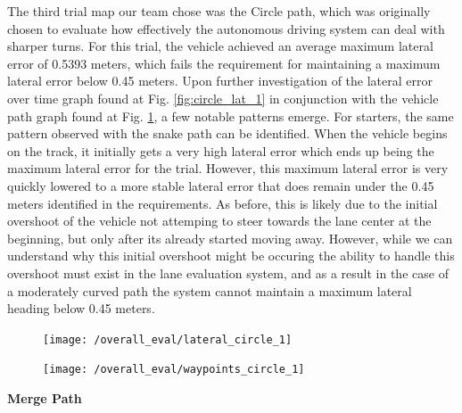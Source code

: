 \documentclass[titlepage,draft]{article}
\begin{document}
{The third trial map our team chose was the Circle path, which was originally chosen to evaluate how effectively the autonomous driving system can deal with sharper turns. For this trial, the vehicle achieved an average maximum lateral error of 0.5393 meters, which fails the requirement for maintaining a maximum lateral error below 0.45 meters. Upon further investigation of the lateral error over time graph found at Fig. \ref{fig:circle_lat_1} in conjunction with the vehicle path graph found at Fig. \ref{fig:circle_way_1}, a few notable patterns emerge. For starters, the same pattern observed with the snake path can be identified. When the vehicle begins on the track, it initially gets a very high lateral error which ends up being the maximum lateral error for the trial. However, this maximum lateral error is very quickly lowered to a more stable lateral error that does remain under the 0.45 meters identified in the requirements. As before, this is likely due to the initial overshoot of the vehicle not attemping to steer towards the lane center at the beginning, but only after its already started moving away. However, while we can understand why this initial overshoot might be occuring the ability to handle this overshoot must exist in the lane evaluation system, and as a result in the case of a moderately curved path the system cannot maintain a maximum lateral heading below 0.45 meters.

\begin{figure}
	\centering
	\begin{minipage}{.45\textwidth}
		\centering
		\texttt{[image: /overall\_eval/lateral\_circle\_1]}
		\label{fig:circle_lat_1}
	\end{minipage}%
	\hspace{0.1\textwidth}%
	\begin{minipage}{.45\textwidth}
		\centering
		\texttt{[image: /overall\_eval/waypoints\_circle\_1]}
		\label{fig:circle_way_1}
	\end{minipage}
\end{figure}

\textbf{Merge Path}

}
\end{document}
